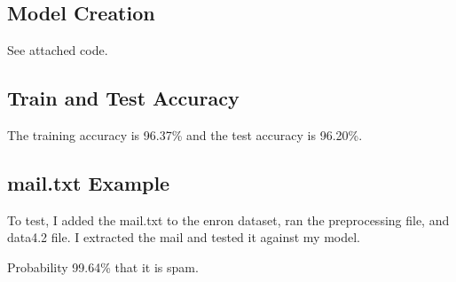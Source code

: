 \documentclass{article}
\begin{document}
\subsection{Model Creation}
See attached code.

\subsection{Train and Test Accuracy}
The training accuracy is 96.37\% and the test accuracy is 96.20\%. 

\subsection{mail.txt Example}
To test, I added the mail.txt to the enron dataset, ran the preprocessing file, and data4.2 file. I extracted the mail and tested it against my model.

Probability 99.64\% that it is spam.
\end{document}
